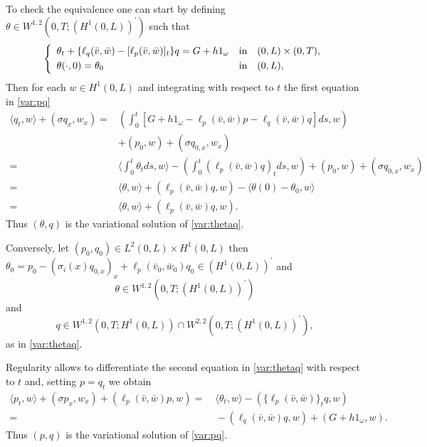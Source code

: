 \documentclass[10pt]{article}
\def\dis{\displaystyle}
\def\om{\omega}
\def\\Phivec{\mathbf{\Phi}}
\begin{document}
To check the equivalence one can start by defining $\theta \in  W^{1,2}(0,T;(H^1(0,L))^\prime)$ such that
$$
	\left\{
		\begin{array}{lcl}
	 \theta_t  + \{\ell_q(\bar v,\bar w)-[\ell_p(\bar v,\bar w)]_t\}q= G+ h1_{\omega}         & \mbox{in}&    (0,L) \times (0,T),        \\
            \noalign{\smallskip}\dis
             \theta(\cdot,0) =\theta_0& \mbox{in}&    (0,L),
		\end{array}
	\right.
$$
	Then for each $w\in H^1(0,L)$ and integrating with respect to $t$ the first equation in \eqref{var:pq}
$$
\begin{alignedat}{2}
	\langle q_t,w\rangle+(\sigma q_x, w_x)=&
\left(\int_0^t[G+h1_\om-\ell_p(\bar v,\bar w)p-\ell_q(\bar v,\bar w) q]ds,w\right)\\
&+(p_0,w)+(\sigma q_{0,x}, w_x)\\
=&
\bigg\langle\int_0^t\theta_tds,w\bigg\rangle-\left(\int_0^t(\ell_p(\bar v,\bar w)q)_tds,w\right)+(p_0,w)+(\sigma q_{0,x}, w_x)\\
=&\langle\theta,w\rangle+(\ell_p(\bar v,\bar w)q,w)-\langle\theta(0)-\theta_0,w\rangle\\
=&\langle\theta,w\rangle+(\ell_p(\bar v,\bar w)q,w).
\end{alignedat}
$$
	Thus $(\theta,q)$ is the variational solution of \eqref{var:thetaq}.

	Conversely, let $(p_0,q_0)\in L^2(0,L)\times H^1(0,L)$ then $\theta_0=p_0-(\sigma_i (x)q_{0,x})_x +\ell_p(\bar v_0,\bar w_0)q_0\in (H^1(0,L))^\prime$ and
\[
	\theta \in  W^{1,2}(0,T;(H^1(0,L))^\prime)
\]
	and
\[
	q \in  W^{1,2}(0,T;H^1(0,L))\cap W^{2,2}(0,T;(H^1(0,L))^\prime),
\]
	as in \eqref{var:thetaq}.
	
	Regularity allows to differentiate the second equation in \eqref{var:thetaq} with respect to $t$ and, setting $p=q_t$ we obtain
$$
\begin{alignedat}{2}
		\langle p_t,w\rangle+(\sigma p_x, w_x) +(\ell_p(\bar v,\bar w)p,w)=&~
	\langle \theta_t,w\rangle-(\{\ell_p(\bar v,\bar w)\}_tq,w)\\
=&~-(\ell_q(\bar v,\bar w) q,w)+(G+h1_{\omega} ,w).
\end{alignedat}
$$
	Thus $(p,q)$ is the variational solution of \eqref{var:pq}.

\
\end{document}
